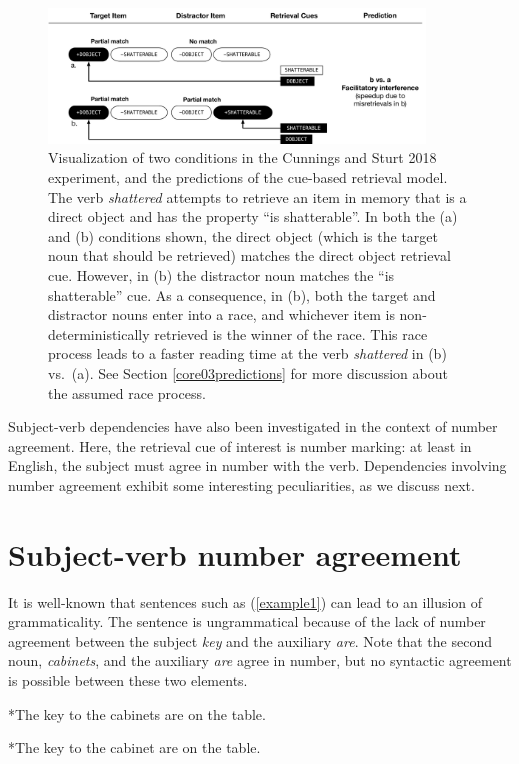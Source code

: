 \documentclass{cambridge7A}\usepackage[]{graphicx}\usepackage[]{color}
\begin{document}
 \begin{figure}[!htbp]
\centering
\includegraphics[width=10cm]{figures/c02cs2018implausible.pdf}
\caption{Visualization of two conditions in the Cunnings and Sturt 2018 experiment, and the predictions of the cue-based retrieval model. The verb \textit{shattered} attempts to retrieve an item in memory that is a direct object and has the property ``is shatterable''. In both the (a) and (b) conditions shown, the direct object (which is the  target noun that should be retrieved) matches the direct object retrieval cue. However, in (b) the distractor noun matches the ``is shatterable'' cue. As a consequence, in (b), both  the target and distractor nouns enter into a race, and whichever item is non-deterministically retrieved is the winner of the race. This race process leads to a faster reading time at the verb \textit{shattered} in (b) vs.\ (a). See Section \ref{core03predictions} for more discussion about the assumed race process.} \label{fig:cunningssturt}
\end{figure}

Subject-verb dependencies have also been investigated in the context of  number agreement. Here, the retrieval cue of interest is number marking: at least in English, the subject must agree in number with the verb. Dependencies involving number agreement exhibit some interesting peculiarities, as we discuss next.

\section{Subject-verb number agreement} 

It is well-known that sentences such as (\ref{example1}) 
can lead to an illusion of grammaticality.  The sentence is 
ungrammatical because of the lack of number agreement between 
the subject \textit{key} and the auxiliary \textit{are}.
Note that the second noun, \textit{cabinets}, and the auxiliary \textit{are} agree in number, but no syntactic agreement is possible between these two elements.

\begin{exe} 
\ex
\begin{xlist}
\item \label{example1}
*The key to the cabinets are on the table.
\item \label{example2}
*The key to the cabinet are on the table.
\end{xlist}
\end{exe}
\end{document}
